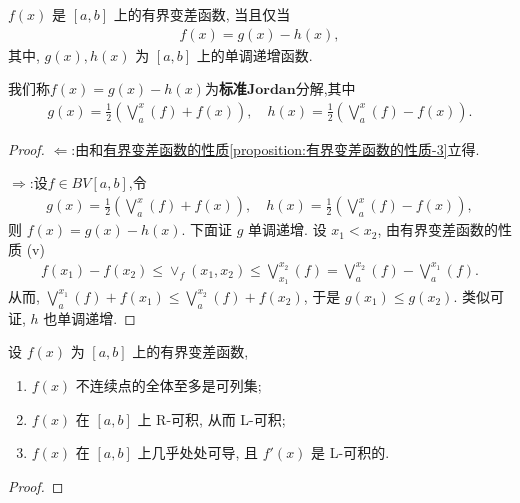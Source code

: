 \documentclass[../../main.tex]{subfiles}%
\begin{document}
\begin{theorem}\label{theorem:实变函数--Jordan(约当)分解定理}
$f(x)$ 是 $[a,b]$ 上的有界变差函数, 当且仅当
\begin{align*}
f(x) = g(x) - h(x),
\end{align*}
其中, $g(x), h(x)$ 为 $[a,b]$ 上的单调递增函数.
\end{theorem}
\begin{remark}
我们称$f(x)=g(x)-h(x)$为\textbf{标准}$\mathbf{Jordan}$分解,其中
\begin{align*}
g(x) = \frac{1}{2}\left(\bigvee_a^x(f) + f(x)\right), \quad h(x) = \frac{1}{2}\left(\bigvee_a^x(f) - f(x)\right).
\end{align*}
\end{remark}
\begin{proof}

$\Longleftarrow$:由和\hyperref[proposition:有界变差函数的性质]{有界变差函数的性质\ref{proposition:有界变差函数的性质-3}}立得.

$\Longrightarrow$:设$f\in BV[a,b]$,令
\begin{align*}
g(x) = \frac{1}{2}\left(\bigvee_a^x(f) + f(x)\right), \quad h(x) = \frac{1}{2}\left(\bigvee_a^x(f) - f(x)\right),
\end{align*}
则 $f(x) = g(x) - h(x)$. 下面证 $g$ 单调递增. 设 $x_1 < x_2$, 由有界变差函数的性质 (v)
\begin{align*}
f(x_1) - f(x_2) \leqslant \vee_f(x_1,x_2) \leqslant \bigvee_{x_1}^{x_2}(f) = \bigvee_a^{x_2}(f) - \bigvee_a^{x_1}(f).
\end{align*}
从而, $\bigvee_a^{x_1}(f) + f(x_1) \leqslant \bigvee_a^{x_2}(f) + f(x_2)$, 于是 $g(x_1) \leqslant g(x_2)$. 类似可证, $h$ 也单调递增.

\end{proof}

\begin{corollary}
设 $f(x)$ 为 $[a,b]$ 上的有界变差函数,
\begin{enumerate}[(1)]
\item $f(x)$ 不连续点的全体至多是可列集;
\item $f(x)$ 在 $[a,b]$ 上 R-可积, 从而 L-可积;
\item $f(x)$ 在 $[a,b]$ 上几乎处处可导, 且 $f'(x)$ 是 L-可积的.
\end{enumerate}
\end{corollary}
\begin{proof}



\end{proof}
\end{document}
